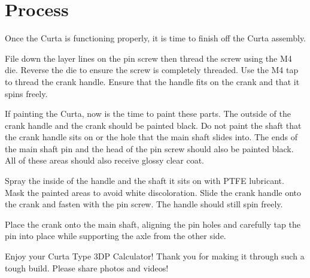 \documentclass[openany]{book}
\begin{document}
\section{Process}
Once the Curta is functioning properly, it is time to finish off the Curta assembly.

File down the layer lines on the pin screw then thread the screw using the M4 die. Reverse the die to ensure the screw is completely threaded. Use the M4 tap to thread the crank handle. Ensure that the handle fits on the crank and that it spins freely.

If painting the Curta, now is the time to paint these parts. The outside of the crank handle and the crank should be painted black. Do not paint the shaft that the crank handle sits on or the hole that the main shaft slides into. The ends of the main shaft pin and the head of the pin screw should also be painted black. All of these areas should also receive glossy clear coat.

Spray the inside of the handle and the shaft it sits on with PTFE lubricant. Mask the painted areas to avoid white discoloration. Slide the crank handle onto the crank and fasten with the pin screw. The handle should still spin freely.

Place the crank onto the main shaft, aligning the pin holes and carefully tap the pin into place while supporting the axle from the other side.

Enjoy your Curta Type 3DP Calculator!
Thank you for making it through such a tough build. Please share photos and videos!
\end{document}
